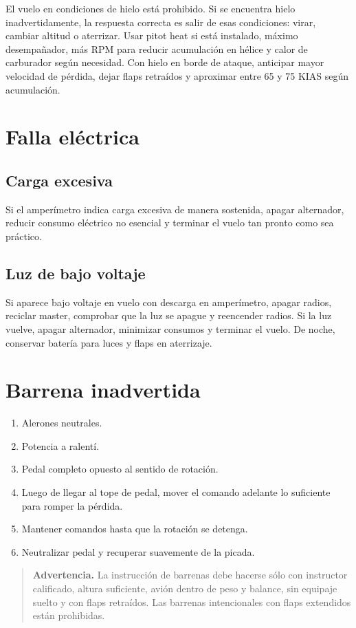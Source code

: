 \documentclass[11pt,oneside]{book}
\newcommand{\warning}[1]{\begin{quote}\small\textbf{Advertencia.} #1\end{quote}}
\newenvironment{checklist}{\begin{enumerate}[label=\arabic*.]}{\end{enumerate}}
\begin{document}
El vuelo en condiciones de hielo está prohibido. Si se encuentra hielo inadvertidamente, la respuesta correcta es salir de esas condiciones: virar, cambiar altitud o aterrizar. Usar pitot heat si está instalado, máximo desempañador, más RPM para reducir acumulación en hélice y calor de carburador según necesidad. Con hielo en borde de ataque, anticipar mayor velocidad de pérdida, dejar flaps retraídos y aproximar entre 65 y 75 KIAS según acumulación.

\section{Falla eléctrica}

\subsection{Carga excesiva}
Si el amperímetro indica carga excesiva de manera sostenida, apagar alternador, reducir consumo eléctrico no esencial y terminar el vuelo tan pronto como sea práctico.

\subsection{Luz de bajo voltaje}
Si aparece bajo voltaje en vuelo con descarga en amperímetro, apagar radios, reciclar master, comprobar que la luz se apague y reencender radios. Si la luz vuelve, apagar alternador, minimizar consumos y terminar el vuelo. De noche, conservar batería para luces y flaps en aterrizaje.

\section{Barrena inadvertida}

\begin{checklist}
\item Alerones neutrales.
\item Potencia a ralentí.
\item Pedal completo opuesto al sentido de rotación.
\item Luego de llegar al tope de pedal, mover el comando adelante lo suficiente para romper la pérdida.
\item Mantener comandos hasta que la rotación se detenga.
\item Neutralizar pedal y recuperar suavemente de la picada.
\end{checklist}

\warning{La instrucción de barrenas debe hacerse sólo con instructor calificado, altura suficiente, avión dentro de peso y balance, sin equipaje suelto y con flaps retraídos. Las barrenas intencionales con flaps extendidos están prohibidas.}
\end{document}
